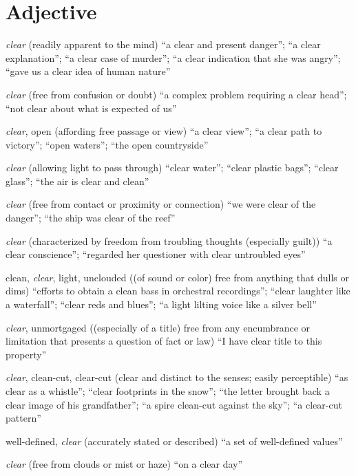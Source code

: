 \section{Adjective}
\begin{description}[leftmargin=1.5cm]
  \item [S: (adj)] \emph{clear} (readily apparent to the mind) ``a clear and present danger''; ``a clear explanation''; ``a clear case of murder''; ``a clear indication that she was angry''; ``gave us a clear idea of human nature''
  \item [S: (adj)] \emph{clear} (free from confusion or doubt) ``a complex problem requiring a clear head''; ``not clear about what is expected of us''
  \item [S: (adj)] \emph{clear}, open (affording free passage or view) ``a clear view''; ``a clear path to victory''; ``open waters''; ``the open countryside''
  \item [S: (adj)] \emph{clear} (allowing light to pass through) ``clear water''; ``clear plastic bags''; ``clear glass''; ``the air is clear and clean''
  \item [S: (adj)] \emph{clear} (free from contact or proximity or connection) ``we were clear of the danger''; ``the ship was clear of the reef''
  \item [S: (adj)] \emph{clear} (characterized by freedom from troubling thoughts (especially guilt)) ``a clear conscience''; ``regarded her questioner with clear untroubled eyes''
  \item [S: (adj)] clean, \emph{clear}, light, unclouded ((of sound or color) free from anything that dulls or dims) ``efforts to obtain a clean bass in orchestral recordings''; ``clear laughter like a waterfall''; ``clear reds and blues''; ``a light lilting voice like a silver bell''
  \item [S: (adj)] \emph{clear}, unmortgaged ((especially of a title) free from any encumbrance or limitation that presents a question of fact or law) ``I have clear title to this property''
  \item [S: (adj)] \emph{clear}, clean-cut, clear-cut (clear and distinct to the senses; easily perceptible) ``as clear as a whistle''; ``clear footprints in the snow''; ``the letter brought back a clear image of his grandfather''; ``a spire clean-cut against the sky''; ``a clear-cut pattern''
  \item [S: (adj)] well-defined, \emph{clear} (accurately stated or described) ``a set of well-defined values''
  \item [S: (adj)] \emph{clear} (free from clouds or mist or haze) ``on a clear day''

\end{description}
